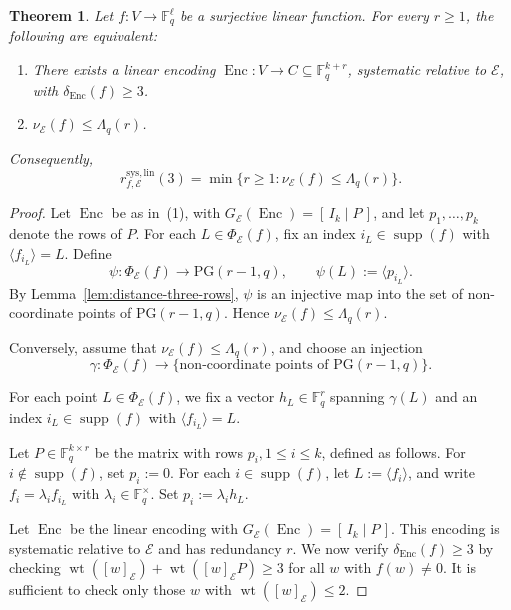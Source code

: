 \documentclass[10pt,a4paper]{amsart}
\newtheorem{theorem}{Theorem}
\newcommand{\Enc}{\operatorname{Enc}}
\newcommand{\F}{\mathbb F}
\newcommand{\wt}{\operatorname{wt}}
\begin{document}
\begin{theorem}
\label{thm:systematic-distance-three}
Let $f\colon V\to\F_q^\ell$ be a surjective linear function. For
every $r\geq1$, the following are equivalent:
\begin{enumerate}
\item There exists a linear encoding
$\Enc\colon V\to C\subseteq\F_q^{k+r}$, systematic relative to
$\mathcal E$, with $\delta_{\Enc}(f)\geq3$.
\item $\nu_{\mathcal E}(f)\leq\Lambda_q(r)$.
\end{enumerate}
Consequently,
\[
r_{f,\mathcal E}^{\mathrm{sys,lin}}(3)
=
\min\{r\geq1:\nu_{\mathcal E}(f)\leq\Lambda_q(r)\}.
\]
\end{theorem}

\begin{proof}
Let $\Enc$ be as in~(1), with
$G_{\mathcal E}(\Enc)=[\,I_k\mid P\,]$, and let
$p_1,\dots,p_k$ denote the rows of $P$. For each
$L\in\Phi_{\mathcal E}(f)$, fix an index
$i_L\in\operatorname{supp}(f)$ with $\langle f_{i_L}\rangle=L$. 
Define
\[
\psi\colon\Phi_{\mathcal E}(f)\longrightarrow\mathrm{PG}(r-1,q),
\qquad
\psi(L):=\langle p_{i_L}\rangle.
\]
By Lemma~\ref{lem:distance-three-rows}, $\psi$ is an injective map into the set of non-coordinate points of $\mathrm{PG}(r-1,q)$. Hence
$\nu_{\mathcal E}(f)\leq\Lambda_q(r)$.

Conversely, assume that 
$\nu_{\mathcal E}(f)\leq\Lambda_q(r)$, and choose an injection
\[
\gamma\colon\Phi_{\mathcal E}(f)\longrightarrow
\{\text{non-coordinate points of }\mathrm{PG}(r-1,q)\}.
\]

For each point $L\in\Phi_{\mathcal E}(f)$, we fix a vector $h_L\in\F_q^r$
spanning $\gamma(L)$ and an index $i_L\in\operatorname{supp}(f)$
with $\langle f_{i_L}\rangle=L$.

Let $P\in\F_q^{k\times r}$ be the matrix with rows
$p_i, 1 \le i\le k$, defined as follows.
For $i\notin\operatorname{supp}(f)$, set
$p_i:=0$. 
For each $i\in\operatorname{supp}(f)$, let $L:=\langle f_i\rangle$,
and   write $f_i=\lambda_i f_{i_L}$ with $\lambda_i\in\F_q^\times$.
Set $p_i:=\lambda_ih_L$. 

Let $\Enc$ be the linear encoding with
$G_{\mathcal E}(\Enc)=[\,I_k\mid P\,]$.
This encoding is systematic relative to $\mathcal E$ and has redundancy $r$.
We now verify $\delta_{\Enc}(f)\geq3$ by checking
$\wt([w]_{\mathcal E})+\wt([w]_{\mathcal E}P)\geq3$ for all $w$
with $f(w)\neq0$. It is sufficient to check only those $w$ with $\wt([w]_{\mathcal E}) \le 2$. 


\end{proof}
\end{document}
